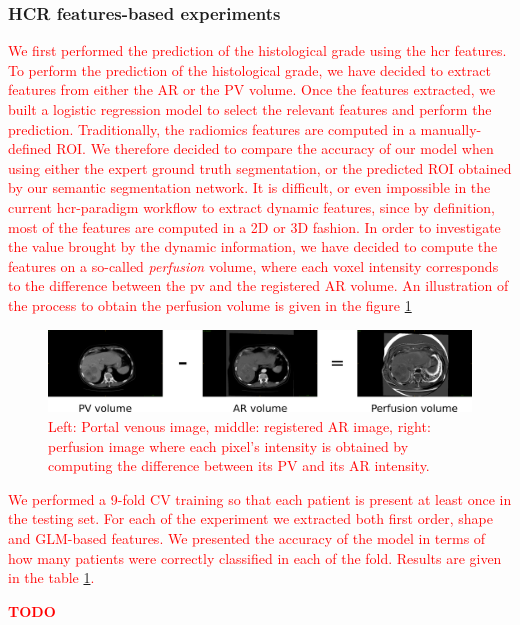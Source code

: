 \subsubsection{HCR features-based experiments}
\textcolor{red}
{
We first performed the prediction of the histological grade using the \ac{hcr} features.
To perform the prediction of the histological grade, we have decided to extract features from either the AR or the PV volume.
Once the features extracted, we built a logistic regression model to select the relevant features and perform the prediction.
Traditionally, the radiomics features are computed in a manually-defined ROI. We therefore decided to compare the accuracy of our model when using either the expert ground truth segmentation, or the predicted ROI obtained by our semantic segmentation network.
It is difficult, or even impossible in the current \ac{hcr}-paradigm workflow to extract dynamic features, since by definition, most of the features are computed in a 2D or 3D fashion. 
In order to investigate the value brought by the dynamic information, we have decided to compute the features on a so-called \textit{perfusion} volume, where each voxel intensity corresponds to the difference between the \ac{pv} and the registered AR volume. An illustration of the process to obtain the perfusion volume is given in the figure \ref{fig:perfusion}
\begin{figure}
\centering
\includegraphics[width=0.9\linewidth]{Contributions/images/perfusion}
\caption{Left: Portal venous image, middle: registered AR image, right: perfusion image where each pixel's intensity is obtained by computing the difference between its PV and its AR intensity.}
\label{fig:perfusion}
\end{figure}
We performed a 9-fold CV training so that each patient is present at least once in the testing set. For each of the experiment we extracted both first order, shape and GLM-based features. We presented the accuracy of the model in terms of how many patients were correctly classified in each of the fold. Results are given in the table \ref{tab:hcrGrade}.
\renewcommand{\arraystretch}{2}
\begin{table}[!htp]\centering
\caption{\textbf{TODO}}\label{tab:hcrGrade}
\scriptsize
\begin{tabular}{lcccc}\toprule

\end{tabular}
\end{table}}
